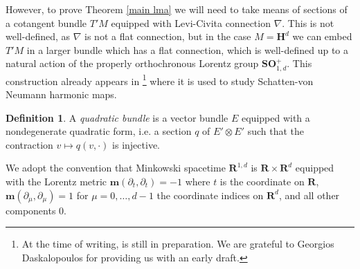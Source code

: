 \documentclass[reqno,12pt,letterpaper]{amsart}
\newcommand{\RR}{\mathbf{R}}
\newcommand{\Hyp}{\mathbf H}
\newcommand{\SpOrth}{\mathbf{SO}}
\newcommand{\Mink}{\mathbf m}
\newcommand{\dfn}[1]{\emph{#1}\index{#1}}
\theoremstyle{definition}
\newtheorem{definition}[theorem]{Definition}
\numberwithin{equation}{section}
\begin{document}
However, to prove Theorem \ref{main lma} we will need to take means of sections of a cotangent bundle $T'M$ equipped with Levi-Civita connection $\nabla$.
This is not well-defined, as $\nabla$ is not a flat connection, but in the case $M = \Hyp^d$ we can embed $T'M$ in a larger bundle which has a flat connection, which is well-defined up to a natural action of the properly orthochronous Lorentz group $\SpOrth_{1, d}^+$.
This construction already appears in \cite{daskalopoulosPrep1}\footnote{At the time of writing, \cite{daskalopoulosPrep1} is still in preparation. We are grateful to Georgios Daskalopoulos for providing us with an early draft.} where it is used to study Schatten-von Neumann harmonic maps.

\begin{definition}
A \dfn{quadratic bundle} is a vector bundle $E$ equipped with a nondegenerate quadratic form, i.e. a section $q$ of $E' \otimes E'$ such that the contraction $v \mapsto q(v, \cdot)$ is injective.
\end{definition}

We adopt the convention that Minkowski spacetime $\RR^{1, d}$ is $\RR \times \RR^d$ equipped with the Lorentz metric $\Mink(\partial_t, \partial_t) = -1$ where $t$ is the coordinate on $\RR$, $\Mink(\partial_\mu, \partial_\mu) = 1$ for $\mu = 0, \dots, d - 1$ the coordinate indices on $\RR^d$, and all other components $0$.
\end{document}
